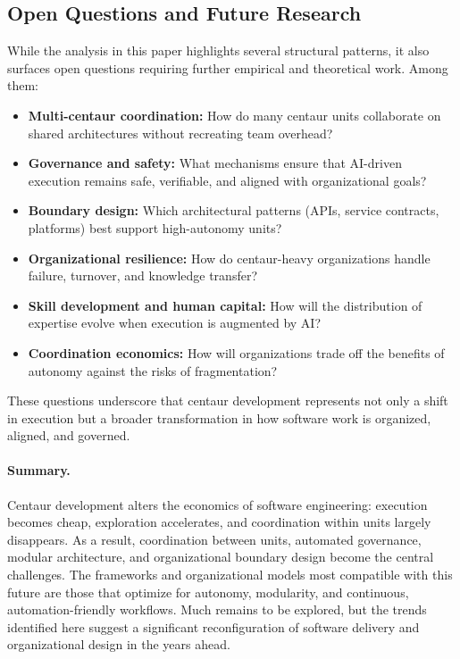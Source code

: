 \documentclass[11pt, a4paper, twocolumn]{article} %
\begin{document}
\subsection*{Open Questions and Future Research}

While the analysis in this paper highlights several structural patterns, it also
surfaces open questions requiring further empirical and theoretical work. Among
them:

\begin{itemize}
    \item \textbf{Multi-centaur coordination:} How do many centaur units
    collaborate on shared architectures without recreating team overhead?
    \item \textbf{Governance and safety:} What mechanisms ensure that AI-driven
    execution remains safe, verifiable, and aligned with organizational goals?
    \item \textbf{Boundary design:} Which architectural patterns (APIs, service
    contracts, platforms) best support high-autonomy units?
    \item \textbf{Organizational resilience:} How do centaur-heavy organizations
    handle failure, turnover, and knowledge transfer?
    \item \textbf{Skill development and human capital:} How will the distribution
    of expertise evolve when execution is augmented by AI?
    \item \textbf{Coordination economics:} How will organizations trade off the
    benefits of autonomy against the risks of fragmentation?
\end{itemize}

These questions underscore that centaur development represents not only a shift
in execution but a broader transformation in how software work is organized,
aligned, and governed.

\paragraph{Summary.}

Centaur development alters the economics of software engineering: execution
becomes cheap, exploration accelerates, and coordination within units largely
disappears. As a result, coordination between units, automated governance,
modular architecture, and organizational boundary design become the central
challenges. The frameworks and organizational models most compatible with this
future are those that optimize for autonomy, modularity, and continuous,
automation-friendly workflows. Much remains to be explored, but the trends
identified here suggest a significant reconfiguration of software delivery and
organizational design in the years ahead.
\end{document}
